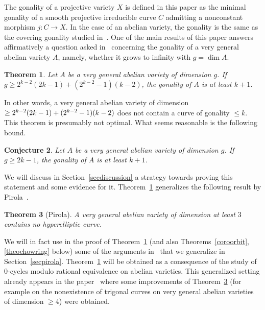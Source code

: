 \documentclass[11pt]{article}
\newtheorem{theo}{Theorem}[section]
\newtheorem{conj}[theo]{Conjecture}
\theoremstyle{definition}
\numberwithin{equation}{section}
\numberwithin{figure}{section}
\numberwithin{table}{section}
\begin{document}
The gonality of a projective variety $X$ is defined in this paper as the minimal gonality of a smooth projective irreducible curve $C$ admitting a nonconstant morphism $j:C\rightarrow X$. In the case of an abelian variety, the gonality is the same as the covering gonality studied in~\cite{lazarsfeld}. One of the main results of this paper answers affirmatively a question asked in~\cite{lazarsfeld} concerning the gonality of a very general abelian variety $A$, namely, whether it grows to infinity with $g=\dim A$.

\begin{theo} \label{theogon}
Let $A$ be a very general abelian variety of dimension $g$. If $g\geq 2^{k-2}(2k-1)+(2^{k-2}-1)(k-2)$, the gonality of $A$ is at least $k+1$.
\end{theo}

In other words, a very general abelian variety of dimension $\geq 2^{k-2}(2k-1)+\linebreak
(2^{k-2}-1)(k-2)$ does not contain a curve of gonality $\leq k$. This theorem is presumably not optimal. What seems reasonable is the following bound.

\begin{conj}\label{conj}
Let $A$ be a very general abelian variety of dimension $g$.
If $g\geq 2k-1$, the gonality of $A$ is at least $k+1$.
\end{conj}

We will discuss in Section~\ref{secdiscussion} a strategy towards proving this statement and some evidence for it. Theorem~\ref{theogon} generalizes the following result by Pirola~\cite{pirola}.

\begin{theo}[Pirola]\label{theopirola}
A very general abelian variety of dimension at least $3$ contains no hyperelliptic curve.
\end{theo}

We will in fact use in the proof of Theorem~\ref{theogon} (and also Theorems~\ref{coroorbit}, \ref{theochowring} below) some of the arguments in~\cite{pirola} that we generalize in Section~\ref{secpirola}. Theorem~\ref{theogon} will be obtained as a consequence of the study of $0$-cycles modulo rational equivalence on abelian varieties. This generalized setting already appears in the paper~\cite{alzatipirola} where some improvements of Theorem~\ref{theopirola} (for example on the nonexistence of trigonal curves on very general abelian varieties of dimension $\geq 4$) were obtained.
\end{document}
